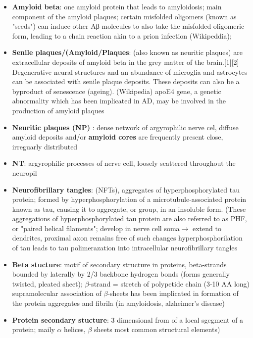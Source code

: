 \documentclass[fleqn]{article}\usepackage{caption}
\begin{document}
\begin{itemize}
\item \textbf{Amyloid beta}: one amyloid protein that leads to amyloidosis; main component of the amyloid plaques; certain misfolded oligomers (known as "seeds") can induce other Aβ molecules to also take the misfolded oligomeric form, leading to a chain reaction akin to a prion infection (Wikipeddia); 


\item \textbf{Senile plaques/(Amyloid/Plaques}: (also known as neuritic plaques) are extracellular deposits of amyloid beta in the grey matter of the brain.[1][2] Degenerative neural structures and an abundance of microglia and astrocytes can be associated with senile plaque deposits. These deposits can also be a byproduct of senescence (ageing). (Wikipedia) 
apoE4 gene, a genetic abnormality which has been implicated in AD, may be involved in the production of amyloid plaques

\item \textbf{Neuritic plaques (NP)} : dense network of argyrophilic nerve cel,  diffuse amyloid deposits and/or \textbf{amyloid cores} are frequently present close, irreguarly distributed %

\item \textbf{NT}: argyrophilic processes of nerve cell, loosely scattered throughout the neuropil %


\item \textbf{Neurofibrillary tangles}: (NFTs),  aggregates of hyperphosphorylated tau protein;  formed by hyperphosphorylation of a microtubule-associated protein known as tau, causing it to aggregate, or group, in an insoluble form. (These aggregations of hyperphosphorylated tau protein are also referred to as PHF, or "paired helical filaments"; develop in nerve cell soma$\rightarrow$ extend to dendrites, proximal axon remains free of such changes %
hyperphosphorilation of tau leads to tau polimerazation into intracellular neurofibrillary tangles %

\item \textbf{Beta stucture}: motif of secondary structure in proteins, beta-strands bounded by laterally by 2/3 backbone hydrogen bonds (forms generally twisted, pleated sheet); $\beta$-strand = stretch of polypetide chain (3-10 AA long) 
supramolecular association of $\beta$-sheets has been implicated in formation of the protein aggregates and fibrila (in amyloidosis, alzheimer's disease)

\item \textbf{Protein secondary stucture}: 3 dimensional from of a local sgegment of a protein; maily $\alpha$ helices, $\beta$ sheets most common structural elements) 


\end{itemize}
\end{document}
